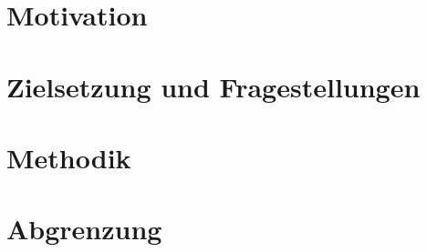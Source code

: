 

\section{Motivation}


\section{Zielsetzung und Fragestellungen}


\section{Methodik}


% 

\section{Abgrenzung}


